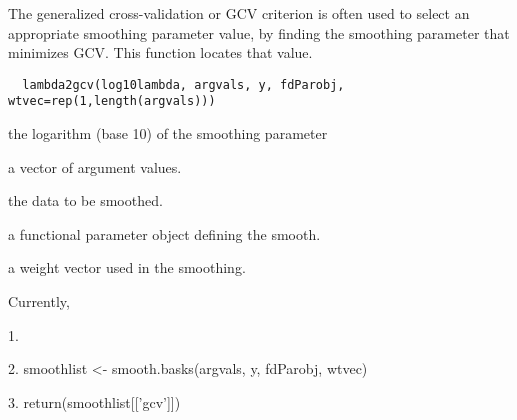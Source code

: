 \begin{Description}\relax
The generalized cross-validation or GCV criterion is often used to
select an appropriate smoothing parameter value, by finding the
smoothing parameter that minimizes GCV.  This function locates that
value.
\end{Description}
\begin{Usage}
\begin{verbatim}
  lambda2gcv(log10lambda, argvals, y, fdParobj, wtvec=rep(1,length(argvals)))
\end{verbatim}
\end{Usage}
\begin{Arguments}
\begin{ldescription}
\item[\code{log10lambda}] the logarithm (base 10) of the smoothing parameter

\item[\code{argvals}] a vector of argument values.

\item[\code{y}] the data to be smoothed.

\item[\code{fdParobj}] a functional parameter object defining the smooth.

\item[\code{wtvec}] a weight vector used in the smoothing.

\end{ldescription}
\end{Arguments}
\begin{Details}\relax
Currently, 
\end{Details}
\begin{Value}
1.  

2.  smoothlist <- smooth.basks(argvals, y, fdParobj, wtvec)

3.  return(smoothlist[['gcv']])
\end{Value}
\begin{SeeAlso}\relax
{}
\end{SeeAlso}

